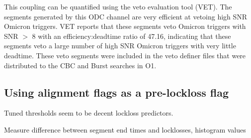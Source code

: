 This coupling can be quantified using the veto evaluation tool (VET). The 
segments generated by this ODC channel are very efficient at vetoing high SNR 
Omicron triggers. VET reports that these segments veto Omicron triggers with SNR 
$>$ 8 with an efficiency:deadtime ratio of 47.16, indicating that these segments 
veto a large number of high SNR Omicron triggers with very little deadtime. These 
veto segments were included in the veto definer files that were distributed to 
the CBC and Burst searches in O1. 

\subsection{Using alignment flags as a pre-lockloss flag}

Tuned thresholds seem to be decent lockloss predictors.

Measure difference between segment end times and locklosses, histogram values


